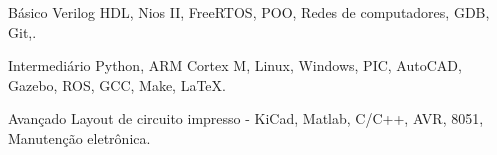 

\begin{cvskills}

  \cvskill
    {Básico} %
    {Verilog HDL, Nios II, FreeRTOS, POO, Redes de computadores, GDB, Git,.} %

  \cvskill
    {Intermediário} %
    {Python, ARM Cortex M, Linux, Windows, PIC, AutoCAD, Gazebo, ROS, GCC, Make, LaTeX.} %

  \cvskill
    {Avançado} %
    {Layout de circuito impresso - KiCad, Matlab, C/C++, AVR, 8051, Manutenção eletrônica.} %

\end{cvskills}




